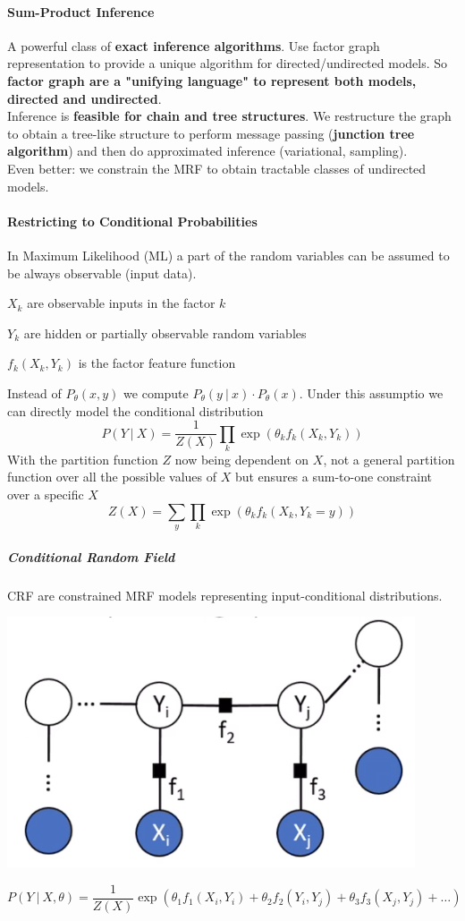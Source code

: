\documentclass[10pt]{report}
\begin{document}
\paragraph{Sum-Product Inference} A powerful class of \textbf{exact inference algorithms}. Use factor graph representation to provide a unique algorithm for directed/undirected models. So \textbf{factor graph are a "unifying language" to represent both models, directed and undirected}.\\
Inference is \textbf{feasible for chain and tree structures}. We restructure the graph to obtain a tree-like structure to perform message passing (\textbf{junction tree algorithm}) and then do approximated inference (variational, sampling).\\
Even better: we constrain the MRF to obtain tractable classes of undirected models.
\paragraph{Restricting to Conditional Probabilities} In Maximum Likelihood (ML) a part of the random variables can be assumed to be always observable (input data).\begin{list}{}{}
	\item $X_k$ are observable inputs in the factor $k$
	\item $Y_k$ are hidden or partially observable random variables
	\item $f_k(X_k, Y_k)$ is the factor feature function
\end{list}
Instead of $P_\theta(x,y)$ we compute $P_\theta(y\:|\:x)\cdot P_\theta(x)$. Under this assumptio we can directly model the conditional distribution $$P(Y\:|\:X) = \frac{1}{Z(X)}\prod_k \exp\left(\theta_kf_k(X_k,Y_k)\right)$$
With the partition function $Z$ now being dependent on $X$, not a general partition function over all the possible values of $X$ but ensures a sum-to-one constraint over a specific $X$
$$Z(X) = \sum_y\prod_k\exp\left(\theta_kf_k(X_k,Y_k = y)\right)$$
\subparagraph{Conditional Random Field} CRF are constrained MRF models representing input-conditional distributions.
\begin{center}
	\includegraphics[scale=0.5]{35.png}
\end{center}
$$P(Y\:|\:X,\theta) = \frac{1}{Z(X)}\exp\left(\theta_1f_1(X_i, Y_i) + \theta_2f_2(Y_i,Y_j) + \theta_3f_3(X_j, Y_j)+\ldots\right)$$
\end{document}
